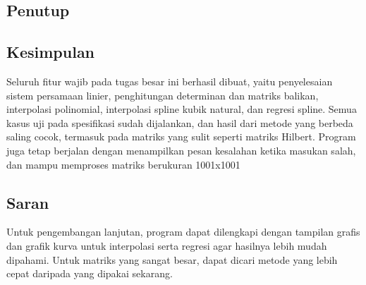 \documentclass[12pt]{article}
\newif\ifbonusinpainting  \bonusinpaintingfalse
\newcommand{\gambarplaceholder}[2][0.5\linewidth]{%
    \fbox{\parbox[c][3cm][c]{#1}{\centering \textit{#2}}}}
\newcommand{\analisis}{%
    \paragraph{Analisis.} Apakah hasil sesuai solusi eksak? Bagaimana perbandingan
    antarmetode (jika berbeda, jelaskan penyebabnya, misalnya galat pembulatan)?
}
\begin{document}
\begin{enumerate}
\ifbonusinpainting
\subsection{Image Inpainting (Bonus)}
\paragraph{Input.} Citra asli dan citra \textit{mask}.
\begin{figure}[H]
    \centering
    \gambarplaceholder[0.3\linewidth]{Citra asli}
    \hfill
    \gambarplaceholder[0.3\linewidth]{Mask}
    \hfill
    \gambarplaceholder[0.3\linewidth]{Hasil}
    \caption{Citra asli, \textit{mask}, dan hasil rekonstruksi}
    \label{fig:inpainting}
\end{figure}
\\
\noindent\textbf{Output.} Jumlah iterasi hingga konvergen, galat akhir, dan dimensi SPL.
\begin{keluaran}
(tempel output program)
\end{keluaran}
\analisis
\fi

\section{Penutup}

\subsection{Kesimpulan}
Seluruh fitur wajib pada tugas besar ini berhasil dibuat, yaitu penyelesaian sistem persamaan linier, penghitungan determinan dan matriks balikan, interpolasi polinomial, interpolasi spline kubik natural, dan regresi spline. Semua kasus uji pada spesifikasi sudah dijalankan, dan hasil dari metode yang berbeda saling cocok, termasuk pada matriks yang sulit seperti matriks Hilbert. Program juga tetap berjalan dengan menampilkan pesan kesalahan ketika masukan salah, dan mampu memproses matriks berukuran 1001x1001

\subsection{Saran}
Untuk pengembangan lanjutan, program dapat dilengkapi dengan tampilan grafis dan grafik kurva untuk interpolasi serta regresi agar hasilnya lebih mudah dipahami. Untuk matriks yang sangat besar, dapat dicari metode yang lebih cepat daripada yang dipakai sekarang.


\end{enumerate}
\end{document}
